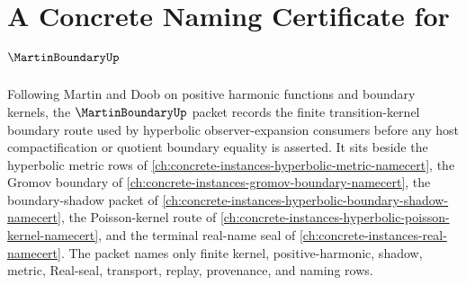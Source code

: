 \chapter{A Concrete Naming Certificate for $\MartinBoundaryUp$}
\label{ch:concrete-instances-martin-boundary-namecert}

Following Martin and Doob on positive harmonic functions and boundary kernels, the $\MartinBoundaryUp$ packet records the finite transition-kernel boundary route used by hyperbolic observer-expansion consumers before any host compactification or quotient boundary equality is asserted. It sits beside the hyperbolic metric rows of \autoref{ch:concrete-instances-hyperbolic-metric-namecert}, the Gromov boundary of \autoref{ch:concrete-instances-gromov-boundary-namecert}, the boundary-shadow packet of \autoref{ch:concrete-instances-hyperbolic-boundary-shadow-namecert}, the Poisson-kernel route of \autoref{ch:concrete-instances-hyperbolic-poisson-kernel-namecert}, and the terminal real-name seal of \autoref{ch:concrete-instances-real-namecert}. The packet names only finite kernel, positive-harmonic, shadow, metric, Real-seal, transport, replay, provenance, and naming rows.

